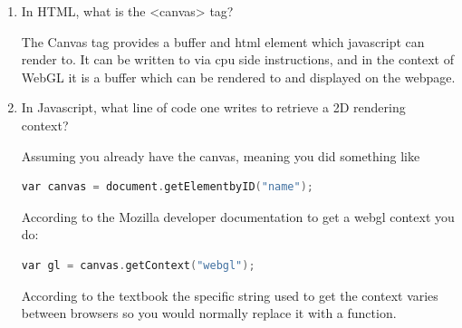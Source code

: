 \documentclass{article}
\begin{document}
\begin{enumerate}
\begin{mdframed}
                These translate to the following software browser components,
                an html rendering engine that handles CSS,
                a javascript runtime,
                and an OpenGL ES context, which is provided by the
                driver.
            \end{mdframed}
        \item In HTML, what is the <canvas> tag?
            \begin{mdframed}
                The Canvas tag provides a buffer and html element
                which javascript can render to. It can be written
                to via cpu side instructions, and in the context
                of WebGL it is a buffer which can be rendered
                to and displayed on the webpage.
            \end{mdframed}
        \item In Javascript, what line of code one writes to retrieve a 2D rendering context?
            \begin{mdframed}
                Assuming you already have the canvas, meaning you did something like

                \begin{lstlisting}[language=C]
var canvas = document.getElementbyID("name");
                \end{lstlisting}

                According to the Mozilla developer documentation
                to get a webgl context you do:

                \begin{lstlisting}[language=C]
var gl = canvas.getContext("webgl"); 
                \end{lstlisting}

                According to the textbook the specific string
                used to get the context varies between browsers
                so you would normally replace it with a function.
            \end{mdframed}
    \end{enumerate}
\end{document}
